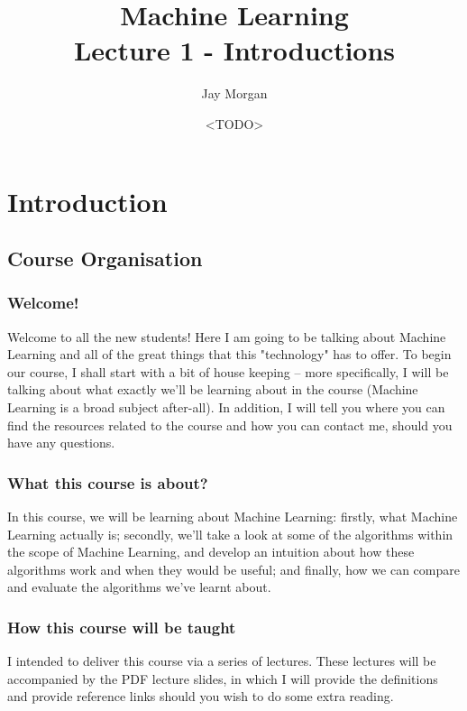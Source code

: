 \documentclass[10pt]{beamer}
\author{Jay Morgan}
\date{<TODO>}
\title{Machine Learning\\\medskip
\large Lecture 1 - Introductions}
\begin{document}
\maketitle

\section*{Introduction}
\label{sec:org20d0ed4}

\subsection*{Course Organisation}
\label{sec:org48b71e9}

\subsubsection*{Welcome!}
\label{sec:org660b64e}

Welcome to all the new students! Here I am going to be talking about Machine Learning
and all of the great things that this "technology" has to offer. To begin our course,
I shall start with a bit of house keeping -- more specifically, I will be talking
about what exactly we'll be learning about in the course (Machine Learning is a broad
subject after-all). In addition, I will tell you where you can find the resources
related to the course and how you can contact me, should you have any questions.

\subsubsection*{What this course is about?}
\label{sec:orgb6f4b28}

In this course, we will be learning about Machine Learning: firstly, what Machine
Learning actually is; secondly, we'll take a look at some of the algorithms within
the scope of Machine Learning, and develop an intuition about how these algorithms
work and when they would be useful; and finally, how we can compare and evaluate the
algorithms we've learnt about.

\subsubsection*{How this course will be taught}
\label{sec:orgb964df9}

I intended to deliver this course via a series of lectures. These lectures will be
accompanied by the PDF lecture slides, in which I will provide the definitions and
provide reference links should you wish to do some extra reading.
\end{document}
